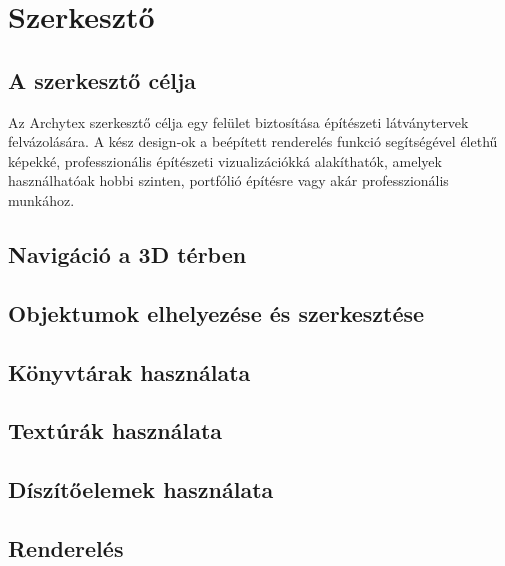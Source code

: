 \section{Szerkesztő}

\subsection{A szerkesztő célja}
Az Archytex szerkesztő célja egy felület biztosítása építészeti látványtervek felvázolására. A kész design-ok a beépített renderelés funkció segítségével élethű képekké, professzionális építészeti vizualizációkká alakíthatók, amelyek használhatóak hobbi szinten, portfólió építésre vagy akár professzionális munkához.



\subsection{Navigáció a 3D térben}

\subsection{Objektumok elhelyezése és szerkesztése}

\subsection{Könyvtárak használata}

\subsection{Textúrák használata}

\subsection{Díszítőelemek használata}

\subsection{Renderelés}